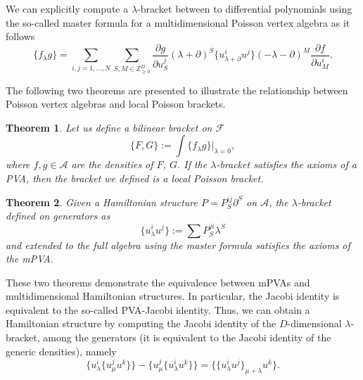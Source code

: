 \documentclass[pdftex]{sigma}
\numberwithin{equation}{section}
\newtheorem{Theorem}{Theorem}[section]
\begin{document}
We can explicitly compute a $\lambda$-bracket between to differential polynomials using the so-called master formula for a multidimensional Poisson vertex algebra \cite{casati2015deformations} as it follows
\begin{equation}\label{eq:master}
\lbrace f_{\lambda}g\rbrace=\sum_{i,j=1,\dots,N}\sum_{S,M\in \mathbb{Z}^D_{\geq0}}\frac{\partial g}{\partial u^j_S}(\lambda+\partial)^S\big\lbrace u^i_{\lambda+\partial}u^j\big\rbrace(-\lambda-\partial)^M\frac{\partial f}{\partial u^i_M}.
\end{equation}

The following two theorems \cite{casati2015deformations} are presented to illustrate the relationship between Poisson vertex algebras and local Poisson brackets.
\begin{Theorem}
Let us define a bilinear bracket on $\mathcal{F}$
\[
\lbrace F,G\rbrace:=\int {\lbrace f_{\lambda} g\rbrace}|_{\lambda=0},
\]
where $f,g\in \mathcal{A}$ are the densities of $F$, $G$.
If the $\lambda$-bracket satisfies the axioms of a PVA, then the bracket we defined is a local Poisson bracket.
\end{Theorem}
\begin{Theorem}
Given a Hamiltonian structure $P=P^{ij}_S\partial^S$ on $\mathcal{A}$,
the $\lambda$-bracket defined on generators as
\[
\big\lbrace u^i_{\lambda}u^j\big\rbrace:=\sum P^{ji}_S\lambda^S
\]
and extended to the full algebra using the master formula satisfies the axioms of the mPVA.
\end{Theorem}
These two theorems demonstrate the equivalence between mPVAs and multidimensional Hamiltonian structures. In particular, the Jacobi identity is equivalent to the so-called PVA-Jacobi identity. Thus, we can obtain a Hamiltonian structure by computing the Jacobi identity of the $D$-dimensional $\lambda$-bracket, among the generators (it is equivalent to the Jacobi identity of the generic densities), namely
\begin{equation}\label{PJ}
\big\lbrace u^i_{\lambda}\big\lbrace u^j_{\mu} u^k\big\rbrace\big\rbrace -\big\lbrace u^j_{\mu}\big\lbrace u^i_{\lambda} u^k\big\rbrace\big\rbrace =\big\lbrace\big\lbrace u^i_{\lambda} u^j\big\rbrace_{\mu +\lambda}u^k\big\rbrace.
\end{equation}
\end{document}
